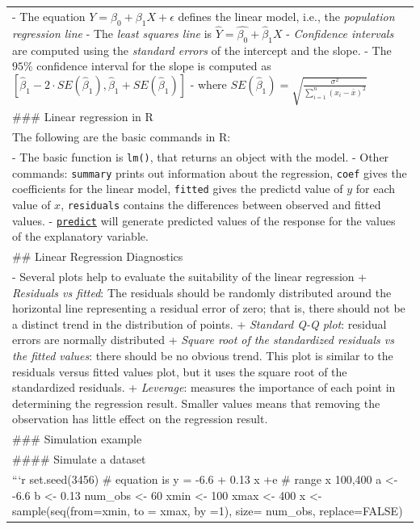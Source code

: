 \documentclass[
]{book}
\begin{document}
\begin{longtable}[]{@{}
  >{\raggedleft\arraybackslash}p{}@{}}
- The equation \( Y = \beta_0 + \beta_1 X + \epsilon\) defines the linear model, i.e., the \emph{population regression line}
- The \emph{least squares line} is \(\hat{Y}=\hat{\beta_0} + \hat{\beta}_1X\)
- \emph{Confidence intervals} are computed using the \emph{standard errors} of the intercept and the slope.
- The \(95\%\) confidence interval for the slope is computed as \([\hat{\beta}_1 - 2 \cdot SE(\hat{\beta}_1), \hat{\beta}_1+SE(\hat{\beta}_1)]\)
- where \( SE(\hat{\beta}_1) = \sqrt{\frac{\sigma^2}{\sum_{i=1}^{n}(x_i-\bar{x})^2}}\) \\
\#\#\# Linear regression in R \\
The following are the basic commands in R: \\
- The basic function is \texttt{lm()}, that returns an object with the model.
- Other commands: \texttt{summary} prints out information about the regression, \texttt{coef} gives the coefficients for the linear model, \texttt{fitted} gives the predictd value of \(y\) for each value of \(x\), \texttt{residuals} contains the differences between observed and fitted values.
- \href{https://stat.ethz.ch/R-manual/R-devel/library/stats/html/predict.lm.html}{\texttt{predict}} will generate predicted values of the response for the values of the explanatory variable. \\
\#\# Linear Regression Diagnostics \\
- Several plots help to evaluate the suitability of the linear regression
+ \emph{Residuals vs fitted}: The residuals should be randomly distributed around the horizontal line representing a residual error of zero; that is, there should not be a distinct trend in the distribution of points.
+ \emph{Standard Q-Q plot}: residual errors are normally distributed
+ \emph{Square root of the standardized residuals vs the fitted values}: there should be no obvious trend. This plot is similar to the residuals versus fitted values plot, but it uses the square root of the standardized residuals.
+ \emph{Leverage}: measures the importance of each point in determining the regression result. Smaller values means that removing the observation has little effect on the regression result. \\
\#\#\# Simulation example \\
\#\#\#\# Simulate a dataset \\
```r
set.seed(3456)
\# equation is y = -6.6 + 0.13 x +e
\# range x 100,400
a \textless- -6.6
b \textless- 0.13
num\_obs \textless- 60
xmin \textless- 100
xmax \textless- 400
x \textless- sample(seq(from=xmin, to = xmax, by =1), size= num\_obs, replace=FALSE) \\

\end{longtable}
\end{document}
